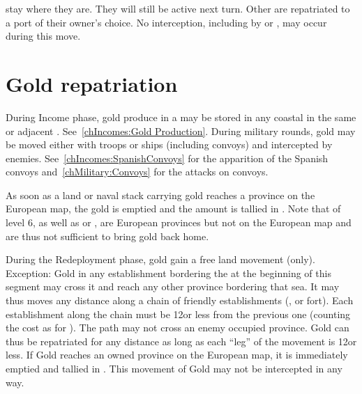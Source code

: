 \bparag {} \corsaire stay where they are. They will still be
active next turn.
\bparag Other \corsaire are repatriated to a port of their owner's choice.
\bparag No interception, including by \Presidios or \StraitFort, may occur
during this move.



\section{Gold repatriation}\label{chRedep:Gold Repatriation}

\bparag[Income.] During Income phase, gold produce in a \COL may be stored in
any coastal \COL in the same or adjacent \Area. See~\ref{chIncomes:Gold
  Production}.
\bparag[Military.] During military rounds, gold may be moved either with
troops or ships (including convoys) and intercepted by
enemies. See~\ref{chIncomes:SpanishConvoys} for the apparition of the Spanish
convoys and~\ref{chMilitary:Convoys} for the attacks on convoys.

\bparag As soon as a land or naval stack carrying gold reaches a province on
the European map, the gold is emptied and the amount is tallied in
.
\bparag Note that \COL of level 6, as well as \provinceAcores or
, are European provinces but not on the European map
and are thus not sufficient to bring gold back home.

\label{chRedep:Gold Transportation}
\bparag During the Redeployment phase, gold gain a free land movement (only).
\bparag Exception: Gold in any establishment bordering the \seazoneCaspienne
at the beginning of this segment may cross it and reach any other province
bordering that sea.
\bparag It may thus moves any distance along a chain of friendly
establishments (\COL, \TP or fort).
\bparag Each establishment along the chain must be 12\MP or less from the
previous one (counting the cost as for \LD).
\bparag The path may not cross an enemy occupied province.
\bparag Gold can thus be repatriated for any distance as long as each ``leg''
of the movement is 12\MP or less.
\bparag If Gold reaches an owned province on the European map, it is
immediately emptied and tallied in .
\bparag This movement of Gold may not be intercepted in any way.


